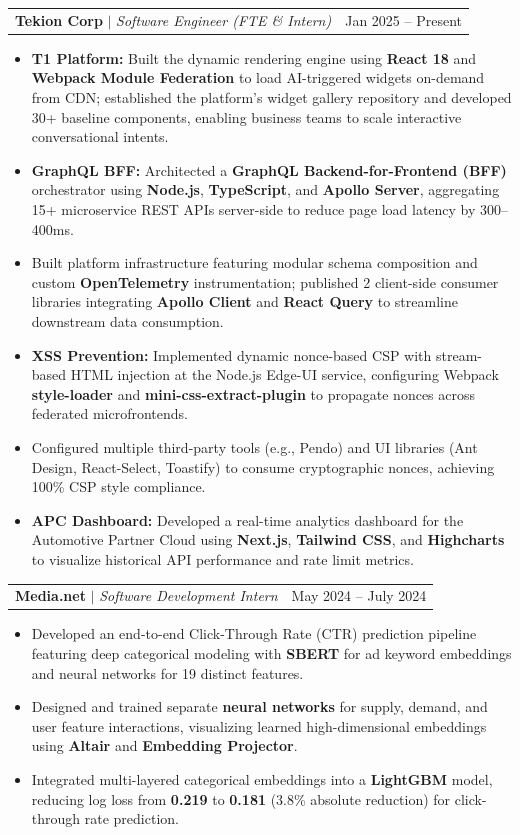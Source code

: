 \documentclass[letterpaper,11pt]{article}
\makeatletter
\newcommand{\resumeItem}[1]{
  \item\small{
    {#1}
  }
}
\newcommand{\resumeProjectHeading}[2]{
    \item
    \begin{tabular*}{\linewidth}{l@{\extracolsep{\fill}}r}
      \small#1 & #2 \\
    \end{tabular*}\vspace{-7pt}
}
\newcommand{\resumeItemListStart}{\begin{itemize}[leftmargin=10pt, itemsep=3.5pt, parsep=0pt, topsep=2pt]}
\newcommand{\resumeItemListEnd}{\end{itemize}\vspace{-5pt}}
\makeatother
\begin{document}
        \resumeProjectHeading
            {\textbf{Tekion Corp} $|$ \footnotesize\emph{Software Engineer (FTE \& Intern)}\vspace{4pt}}{Jan 2025 -- Present}
        \resumeItemListStart
            \resumeItem{\textbf{T1 Platform:} Built the dynamic rendering engine using \textbf{React 18} and \textbf{Webpack Module Federation} to load AI-triggered widgets on-demand from CDN; established the platform's widget gallery repository and developed 30+ baseline components, enabling business teams to scale interactive conversational intents.}
            \resumeItem{\textbf{GraphQL BFF:} Architected a \textbf{GraphQL Backend-for-Frontend (BFF)} orchestrator using \textbf{Node.js}, \textbf{TypeScript}, and \textbf{Apollo Server}, aggregating 15+ microservice REST APIs server-side to reduce page load latency by 300--400ms.}
            \resumeItem{Built platform infrastructure featuring modular schema composition and custom \textbf{OpenTelemetry} instrumentation; published 2 client-side consumer libraries integrating \textbf{Apollo Client} and \textbf{React Query} to streamline downstream data consumption.}
            \resumeItem{\textbf{XSS Prevention:} Implemented dynamic nonce-based CSP with stream-based HTML injection at the Node.js Edge-UI service, configuring Webpack \textbf{style-loader} and \textbf{mini-css-extract-plugin} to propagate nonces across federated microfrontends.}
            \resumeItem{Configured multiple third-party tools (e.g., Pendo) and UI libraries (Ant Design, React-Select, Toastify) to consume cryptographic nonces, achieving 100\% CSP style compliance.}
            \resumeItem{\textbf{APC Dashboard:} Developed a real-time analytics dashboard for the Automotive Partner Cloud using \textbf{Next.js}, \textbf{Tailwind CSS}, and \textbf{Highcharts} to visualize historical API performance and rate limit metrics.}
        \resumeItemListEnd

        \resumeProjectHeading
          {\textbf{Media.net} $|$ \footnotesize\emph{Software Development Intern}\vspace{4pt}}{May 2024 -- July 2024}
        \resumeItemListStart
            \resumeItem{Developed an end-to-end Click-Through Rate (CTR) prediction pipeline featuring deep categorical modeling with \textbf{SBERT} for ad keyword embeddings and neural networks for 19 distinct features.}
            \resumeItem{Designed and trained separate \textbf{neural networks} for supply, demand, and user feature interactions, visualizing learned high-dimensional embeddings using \textbf{Altair} and \textbf{Embedding Projector}.}
            \resumeItem{Integrated multi-layered categorical embeddings into a \textbf{LightGBM} model, reducing log loss from \textbf{0.219} to \textbf{0.181} (3.8\% absolute reduction) for click-through rate prediction.}
        \resumeItemListEnd
          
\end{document}
